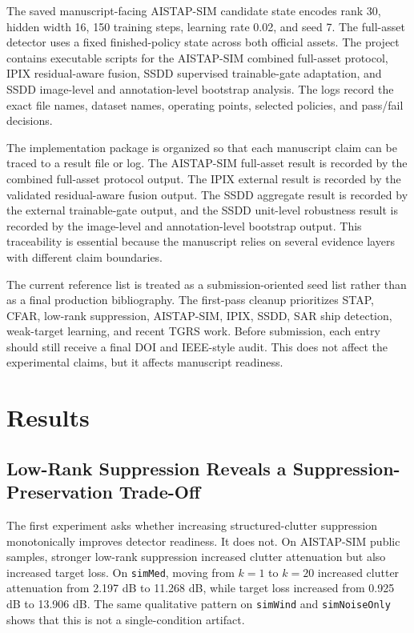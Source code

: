 \documentclass[journal]{IEEEtran}
\begin{document}
The saved manuscript-facing AISTAP-SIM candidate state encodes rank 30, hidden width 16, 150 training steps, learning rate 0.02, and seed 7. The full-asset detector uses a fixed finished-policy state across both official assets. The project contains executable scripts for the AISTAP-SIM combined full-asset protocol, IPIX residual-aware fusion, SSDD supervised trainable-gate adaptation, and SSDD image-level and annotation-level bootstrap analysis. The logs record the exact file names, dataset names, operating points, selected policies, and pass/fail decisions.

The implementation package is organized so that each manuscript claim can be traced to a result file or log. The AISTAP-SIM full-asset result is recorded by the combined full-asset protocol output. The IPIX external result is recorded by the validated residual-aware fusion output. The SSDD aggregate result is recorded by the external trainable-gate output, and the SSDD unit-level robustness result is recorded by the image-level and annotation-level bootstrap output. This traceability is essential because the manuscript relies on several evidence layers with different claim boundaries.

The current reference list is treated as a submission-oriented seed list rather than as a final production bibliography. The first-pass cleanup prioritizes STAP, CFAR, low-rank suppression, AISTAP-SIM, IPIX, SSDD, SAR ship detection, weak-target learning, and recent TGRS work. Before submission, each entry should still receive a final DOI and IEEE-style audit. This does not affect the experimental claims, but it affects manuscript readiness.

\section{Results}

\subsection{Low-Rank Suppression Reveals a Suppression-Preservation Trade-Off}

The first experiment asks whether increasing structured-clutter suppression monotonically improves detector readiness. It does not. On AISTAP-SIM public samples, stronger low-rank suppression increased clutter attenuation but also increased target loss. On \texttt{simMed}, moving from $k=1$ to $k=20$ increased clutter attenuation from 2.197 dB to 11.268 dB, while target loss increased from 0.925 dB to 13.906 dB. The same qualitative pattern on \texttt{simWind} and \texttt{simNoiseOnly} shows that this is not a single-condition artifact.
\end{document}

